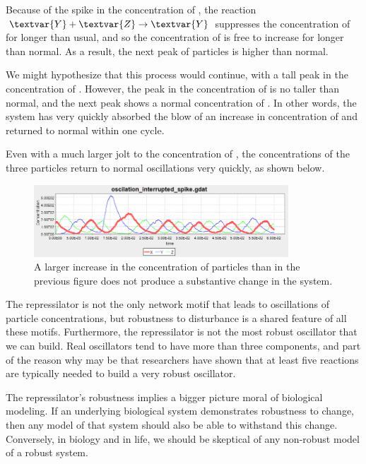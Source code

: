 Because of the spike in the concentration of , the reaction $\textvar{Y} + \textvar{Z} \rightarrow \textvar{Y}$ suppresses the concentration of  for longer than usual, and so the concentration of  is free to increase for longer than normal. As a result, the next peak of  particles is higher than normal.

We might hypothesize that this process would continue, with a tall peak in the concentration of . However, the peak in the concentration of  is no taller than normal, and the next peak shows a normal concentration of . In other words, the system has very quickly absorbed the blow of an increase in concentration of  and returned to normal within one cycle.

Even with a much larger jolt to the concentration of , the concentrations of the three particles return to normal oscillations very quickly, as shown below.\\

\begin{figure}[h]
\centering
\mySfFamily
\includegraphics[width = 0.85\textwidth]{../images/nf_sim_interrupted_chart_spike.png}
\caption{A larger increase in the concentration of  particles than in the previous figure does not produce a substantive change in the system.}
\label{fig:nf_sim_interrupted_chart_spike}
\end{figure}

The repressilator is not the only network motif that leads to oscillations of particle concentrations, but robustness to disturbance is a shared feature of all these motifs. Furthermore, the repressilator is not the most robust oscillator that we can build. Real oscillators tend to have more than three components, and part of the reason why may be that researchers have shown that at least five reactions are typically needed to build a very robust oscillator.

The repressilator's robustness implies a bigger picture moral of biological modeling. If an underlying biological system demonstrates robustness to change, then any model of that system should also be able to withstand this change. Conversely, in biology and in life, we should be skeptical of any non-robust model of a robust system.

